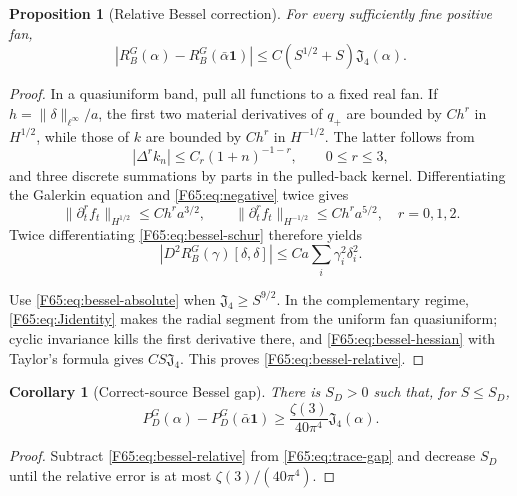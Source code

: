 \documentclass[11pt]{amsart}
\numberwithin{equation}{section}
\newtheorem{proposition}[theorem]{Proposition}
\newtheorem{corollary}[theorem]{Corollary}
\theoremstyle{definition}
\theoremstyle{remark}
\newcommand{\Jfour}{\mathfrak J_4}
\newcommand{\qplus}{q_+}
\begin{document}
\begin{proposition}[Relative Bessel correction]\label{F65:prop:bessel-relative}
For every sufficiently fine positive fan,
\begin{equation}\label{F65:eq:bessel-relative}
 |R_B^G(\alpha)-R_B^G(\bar\alpha\mathbf1)|
 \le C(S^{1/2}+S)\Jfour(\alpha).
\end{equation}
\end{proposition}

\begin{proof}
In a quasiuniform band, pull all functions to a fixed real fan.  If
$h=\|\delta\|_{\ell^\infty}/a$, the first two material derivatives of
$\qplus$ are bounded by $Ch^r$ in $H^{1/2}$, while those of $k$ are bounded
by $Ch^r$ in $H^{-1/2}$.  The latter follows from
\begin{equation}
 |\Delta^rk_n|\le C_r(1+n)^{-1-r},\qquad 0\le r\le3,
\end{equation}
and three discrete summations by parts in the pulled-back kernel.
Differentiating the Galerkin equation and \eqref{F65:eq:negative} twice gives
\begin{equation}
 \|\partial_t^rf_t\|_{H^{1/2}}\le Ch^ra^{3/2},
 \qquad
 \|\partial_t^rf_t\|_{H^{-1/2}}\le Ch^ra^{5/2},
 \quad r=0,1,2.
\end{equation}
Twice differentiating \eqref{F65:eq:bessel-schur} therefore yields
\begin{equation}\label{F65:eq:bessel-hessian}
 |D^2R_B^G(\gamma)[\delta,\delta]|
 \le Ca\sum_i\gamma_i^2\delta_i^2.
\end{equation}

Use \eqref{F65:eq:bessel-absolute} when
$\Jfour\ge S^{9/2}$.  In the complementary regime,
\eqref{F65:eq:Jidentity} makes the radial segment from the uniform fan
quasiuniform; cyclic invariance kills the first derivative there, and
\eqref{F65:eq:bessel-hessian} with Taylor's formula gives
$CS\Jfour$.  This proves \eqref{F65:eq:bessel-relative}.
\end{proof}

\begin{corollary}[Correct-source Bessel gap]\label{F65:cor:bessel-gap}
There is $S_D>0$ such that, for $S\le S_D$,
\begin{equation}\label{F65:eq:bessel-gap}
 \boxed{
 P_D^G(\alpha)-P_D^G(\bar\alpha\mathbf1)
 \ge\frac{\zeta(3)}{40\pi^4}\Jfour(\alpha).}
\end{equation}
\end{corollary}

\begin{proof}
Subtract \eqref{F65:eq:bessel-relative} from \eqref{F65:eq:trace-gap} and decrease
$S_D$ until the relative error is at most $\zeta(3)/(40\pi^4)$.
\end{proof}
\end{document}
